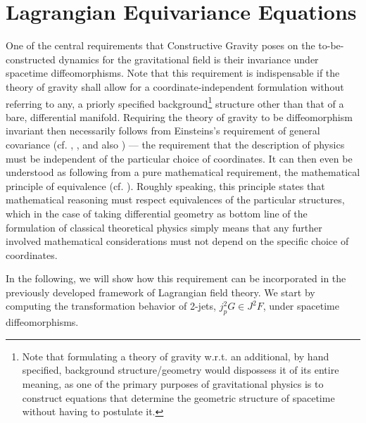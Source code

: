 \section{Lagrangian Equivariance Equations}
One of the central requirements that Constructive Gravity poses on the to-be-constructed dynamics for the gravitational field is their invariance under spacetime diffeomorphisms.
Note that this requirement is indispensable if the theory of gravity shall allow for a coordinate-independent formulation without referring to any, a priorly specified background\footnote{Note that formulating a theory of gravity w.r.t. an additional, by hand specified, background structure/geometry would dispossess it of its entire meaning, as one of the primary purposes of gravitational physics is to construct equations that determine the geometric structure of spacetime without having to postulate it.} structure other than that of a bare, differential manifold.
Requiring the theory of gravity to be diffeomorphism invariant then necessarily follows from Einsteins's requirement of general covariance (cf. \cite{nlab:Cov}, \cite{Stachel1993-STATMO-5}, \cite{Pooley} and also \cite{Norton1993-NORGCA}) --- the requirement that the description of physics must be independent of the particular choice of coordinates.
It can then even be understood as following from a pure mathematical requirement, the mathematical principle of equivalence (cf. \cite{nlab:Equi}). Roughly speaking, this principle states that mathematical reasoning  must respect equivalences of the particular structures, which in the case of taking differential geometry as bottom line of the formulation of classical theoretical physics simply means that any further involved mathematical considerations must not depend on the specific choice of coordinates. 

In the following, we will show how this requirement can be incorporated in the previously developed framework of Lagrangian field theory. We start by computing the transformation behavior of 2-jets, $j_p^2G \in J^2F$, under spacetime diffeomorphisms.


